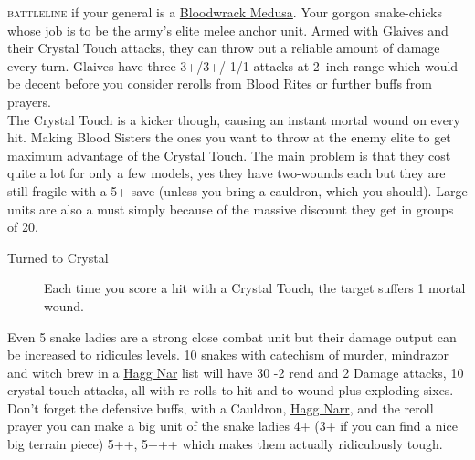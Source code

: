 \textsc{battleline} if your general is
a \hyperref[bloodwrack-medusa]{Bloodwrack Medusa}. Your gorgon snake-chicks
whose job is to be the army's elite melee anchor unit. Armed with Glaives and
their Crystal Touch attacks, they can throw out a reliable amount of damage
every turn. Glaives have three 3+/3+/-1/1 attacks at 2~inch range which would
be decent before you consider rerolls from Blood Rites or further buffs from
prayers.\\
The Crystal Touch is a kicker though, causing an instant mortal wound on every
hit. Making Blood Sisters the ones you want to throw at the enemy elite to get
maximum advantage of the Crystal Touch. The main problem is that they cost
quite a lot for only a few models, yes they have two-wounds each but they are
still fragile with a 5+ save (unless you bring a cauldron, which you should).
Large units are also a must simply because of the massive discount they get in
groups of 20. \\

\begin{description}
    \item  [Turned to Crystal] Each time you score a hit with a Crystal Touch, the target suffers 1 mortal wound.
\end{description}

Even 5 snake ladies are a strong close combat unit
but their damage output can be increased to ridicules levels. 10 snakes with
\hyperref[catechism-of-murder]{catechism of murder}, mindrazor and witch brew
in a \hyperref[hagg-nar]{Hagg Nar} list will have 30 -2 rend and 2 Damage
attacks, 10 crystal touch attacks, all with re-rolls to-hit and to-wound plus
exploding sixes.\\
Don't forget the defensive buffs, with a Cauldron, \hyperref[hagg-nar]{Hagg
Narr}, and the reroll prayer you can make a big unit of the snake ladies 4+ (3+
if you can find a nice big terrain piece) 5++, 5+++ which makes them actually
ridiculously tough.  


